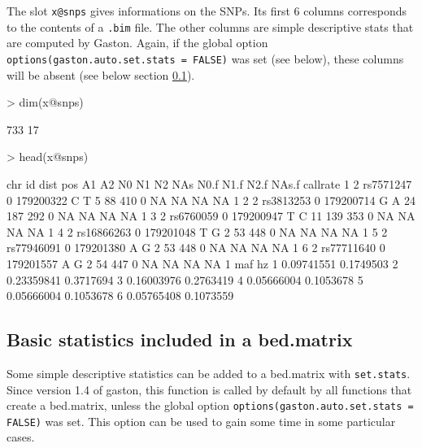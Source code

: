 \documentclass{article}
\renewenvironment{Schunk}{\vspace{\topsep}}{\vspace{\topsep}}
\begin{document}
  The slot \verb!x@snps! gives informations on the SNPs. Its first 6
  columns corresponds to the contents of a \verb!.bim! file. The other
  columns are simple descriptive stats that are computed by Gaston. Again, if 
  the global option 
  \verb!options(gaston.auto.set.stats = FALSE)! was set (see below), these
  columns will be absent (see below section \ref{stats}).

\pagebreak
\begin{Schunk}
\begin{Sinput}
> dim(x@snps)
\end{Sinput}
\begin{Soutput}
[1] 733  17
\end{Soutput}
\begin{Sinput}
> head(x@snps)
\end{Sinput}
\begin{Soutput}
  chr         id dist       pos A1 A2 N0  N1  N2 NAs N0.f N1.f N2.f NAs.f callrate
1   2  rs7571247    0 179200322  C  T  5  88 410   0   NA   NA   NA    NA        1
2   2  rs3813253    0 179200714  G  A 24 187 292   0   NA   NA   NA    NA        1
3   2  rs6760059    0 179200947  T  C 11 139 353   0   NA   NA   NA    NA        1
4   2 rs16866263    0 179201048  T  G  2  53 448   0   NA   NA   NA    NA        1
5   2 rs77946091    0 179201380  A  G  2  53 448   0   NA   NA   NA    NA        1
6   2 rs77711640    0 179201557  A  G  2  54 447   0   NA   NA   NA    NA        1
         maf        hz
1 0.09741551 0.1749503
2 0.23359841 0.3717694
3 0.16003976 0.2763419
4 0.05666004 0.1053678
5 0.05666004 0.1053678
6 0.05765408 0.1073559
\end{Soutput}
\end{Schunk}

\subsection{Basic statistics included in a bed.matrix}\label{stats}

  Some simple descriptive statistics can be added to a bed.matrix with \verb!set.stats!.
  Since version 1.4 of gaston, this function is called by default by all functions that create 
  a bed.matrix, unless the global option \verb!options(gaston.auto.set.stats = FALSE)! was set.
  This option can be used to gain some time in some particular cases. 
\end{document}

